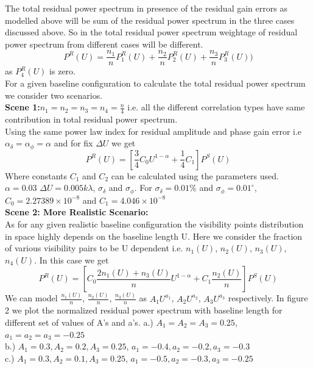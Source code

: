 \documentclass[fleqn,usenatbib]{mnras}
\begin{document}
The total residual power spectrum in presence of the residual gain errors as modelled above will be sum of the residual power spectrum in the three cases discussed above.
So in the total residual power spectrum weightage of residual power spectrum from different cases will be different.
\begin{equation}
    P^R(U) =  \frac{n_1}{n} P_1^R(U) + \frac{n_2}{n} P_2^R(U) + \frac{n_3}{n} P_3^R(U) )
\end{equation}
as $P_4^R(U)$ is zero.\\
For a given baseline configuration to calculate the total residual power spectrum we consider two scenarios.\\
\textbf{Scene 1:}$n_1 = n_2 = n_3 = n_4 = \frac{n}{4}$ i.e. all the different correlation types have same contribution in total residual power spectrum.\\
Using the same power law index for residual amplitude and phase gain error i.e $\alpha_{\delta} = \alpha_{\phi} = \alpha$ and for fix $\Delta U$ we get
\begin{equation}
    {P^R(U)} = [\frac{3}{4}C_0U^{1-\alpha} + \frac{1}{4}C_1]{P^S(U)}
\end{equation}
Where constants $C_1$ and $C_2$ can be calculated using the parameters used. $\alpha = 0.03$ $\Delta U = 0.005 k\lambda$, $\sigma_{\delta}$ and $\sigma_{\phi}$. For $\sigma_{\delta} = 0.01\%$ and $\sigma_{\phi} = 0.01^{\circ}$, $C_0 = 2.27389\times 10^{-8}$  and $C_1 = 4.046\times10^{-8}$\\

\textbf{Scene 2: More Realistic Scenario:}\\
As for any given realistic baseline configuration the visibility points distribution in space highly depends on the baseline length U. Here we consider the fraction of various visibility pairs to be U dependent i.e. $n_1(U)$, $n_2(U)$, $n_3(U)$, $n_4(U)$. In this case we get
\begin{equation}
    {P^R(U)} = [C_0 \frac{2 n_1(U)+n_3(U)}{n}U^{1-\alpha} + C_1 \frac{n_2(U)}{n}]{P^S(U)}
    \end{equation}
We can model $\frac{n_1(U)}{n}$, $\frac{n_2(U)}{n}$, $\frac{n_3(U)}{n}$ as $A_1U^{a_1}$, $A_2U^{a_2}$, $A_3U^{a_3}$ respectively.
In figure 2 we plot the normalized residual power spectrum with baseline length for different set of values of A's and a's. 
a.) $A_1 = A_2 = A_3 = 0.25$, $a_1 = a_2 = a_3 = -0.25$\\
b.) $A_1 = 0.3, A_2 = 0.2, A_3 = 0.25$, $a_1 = -0.4, a_2 = -0.2, a_3 = -0.3$\\
c.) $A_1 = 0.3, A_2 = 0.1, A_3 = 0.25$, $a_1 = -0.5, a_2 = -0.3, a_3 = -0.25$\\
\end{document}
